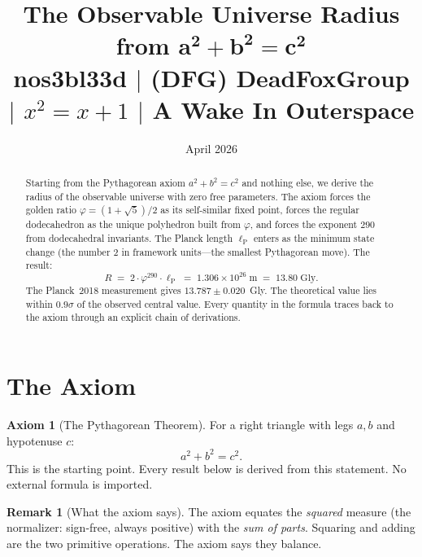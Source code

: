 \documentclass[11pt,a4paper]{article}
\theoremstyle{plain}
\theoremstyle{definition}
\newtheorem{axiom}[theorem]{Axiom}
\newtheorem{remark}[theorem]{Remark}
\newcommand{\lP}{\ell_{\mathrm{P}}}
\newcommand{\vp}{\varphi}
\begin{document}
\title{%
  \textbf{The Observable Universe Radius}\\[4pt]
  \textbf{from $\boldsymbol{a^2 + b^2 = c^2}$}\\[8pt]
  \large nos3bl33d \;$\mid$\; (DFG) DeadFoxGroup
  \;$\mid$\; $x^2 = x + 1$
  \;$\mid$\; A Wake In Outerspace%
}
\author{}
\date{April 2026}

\maketitle

\begin{abstract}
Starting from the Pythagorean axiom $a^2 + b^2 = c^2$ and nothing else,
we derive the radius of the observable universe with zero free parameters.
The axiom forces the golden ratio $\vp = (1+\sqrt{5})/2$ as its
self-similar fixed point, forces the regular dodecahedron as the unique
polyhedron built from $\vp$, and forces the exponent $290$ from
dodecahedral invariants.  The Planck length $\lP$ enters as the minimum
state change (the number $2$ in framework units---the smallest Pythagorean
move).  The result:
\[
  R \;=\; 2 \cdot \vp^{290} \cdot \lP
  \;=\; 1.306 \times 10^{26}\;\text{m}
  \;=\; 13.80\;\text{Gly}.
\]
The Planck~2018 measurement gives $13.787 \pm 0.020$~Gly.  The
theoretical value lies within $0.9\sigma$ of the observed central
value.  Every quantity in the formula traces back to the axiom through
an explicit chain of derivations.
\end{abstract}

\section{The Axiom}\label{sec:axiom}

\begin{axiom}[The Pythagorean Theorem]\label{ax:pyth}
For a right triangle with legs $a, b$ and hypotenuse $c$:
\[
  a^2 + b^2 = c^2.
\]
This is the starting point.  Every result below is derived from this
statement.  No external formula is imported.
\end{axiom}

\begin{remark}[What the axiom says]
The axiom equates the \emph{squared} measure (the normalizer: sign-free,
always positive) with the \emph{sum of parts}.  Squaring and adding are
the two primitive operations.  The axiom says they balance.
\end{remark}
\end{document}
